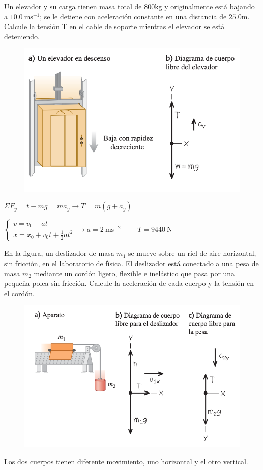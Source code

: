 \begin{prob}
\begin{multicols}{2}
Un elevador y su carga tienen masa total de $800 \mathrm{kg}$  y originalmente está bajando a $10.0 \ \mathrm{ms}^{-1}$; se le detiene con aceleración constante en una distancia de $25.0 \mathrm{m}$. Calcule la tensión T en el cable de soporte mientras el elevador se está deteniendo.	
\begin{figure}[H]
	\centering
	\includegraphics[width=.55\textwidth]{imagenes/imagenes03/T03IM39.png}
	\end{figure}
\end{multicols}
\end{prob}
$\Sigma F_y=t-mg=ma_y \to T=m(g+a_y)$

$\begin{cases} v=v_0+at \\ x=x_0+v_0 t + \frac 1 2 a t^2  \end{cases} \to a=2\ \mathrm{m s}^{-2}$ $\qquad T=9440\ \mathrm{N}$


\vspace{10mm} %
\begin{prob}
En la figura, un deslizador de masa $m_1$ se mueve sobre un riel de aire horizontal, sin fricción, en el laboratorio de física. El deslizador está conectado a una pesa de masa $m_2$ mediante un cordón ligero, flexible e inelástico que pasa por una pequeña polea sin fricción. Calcule la aceleración de cada cuerpo y la tensión en el cordón.	
\begin{figure}[H]
	\centering
	\includegraphics[width=.85\textwidth]{imagenes/imagenes03/T03IM40.png}
	\end{figure}
\end{prob}
\vspace{-4mm} \small{Los dos cuerpos tienen diferente movimiento, uno horizontal y el otro vertical.}

